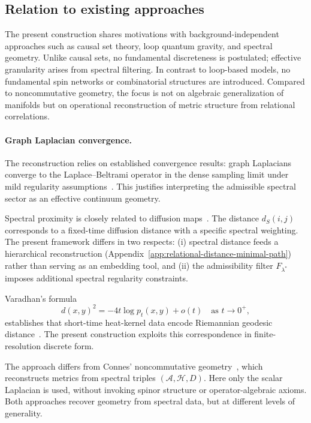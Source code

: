 \subsection{Relation to existing approaches}
  \label{subsec:relation-to-existing-approaches}

  The present construction shares motivations with
  background-independent approaches such as causal set theory,
  loop quantum gravity, and spectral geometry.
  Unlike causal sets, no fundamental discreteness is postulated;
  effective granularity arises from spectral filtering.
  In contrast to loop-based models, no fundamental spin networks
  or combinatorial structures are introduced.
  Compared to noncommutative geometry,
  the focus is not on algebraic generalization of manifolds
  but on operational reconstruction of metric structure
  from relational correlations.

  \paragraph{Graph Laplacian convergence.}

    The reconstruction relies on established convergence results:
    graph Laplacians converge to the Laplace--Beltrami operator
    in the dense sampling limit under mild regularity assumptions~\cite{Belkin2003,Hein2007}.
    This justifies interpreting the admissible spectral sector
    as an effective continuum geometry.

    Spectral proximity is closely related to diffusion maps~\cite{Coifman2006}.
    The distance $d_S(i,j)$ corresponds to a fixed-time diffusion
    distance with a specific spectral weighting.
    The present framework differs in two respects:
    (i) spectral distance feeds a hierarchical reconstruction
    (Appendix~\ref{app:relational-distance-minimal-path}) rather than serving as an embedding tool,
    and (ii) the admissibility filter $F_{\lambda^*}$
    imposes additional spectral regularity constraints.

    Varadhan’s formula
    \begin{equation}
      d(x,y)^2 = -4t \log p_t(x,y) + o(t)
      \quad \text{as } t \to 0^+,
    \end{equation}
    establishes that short-time heat-kernel data encode
    Riemannian geodesic distance~\cite{Varadhan1967}.
    The present construction exploits this correspondence
    in finite-resolution discrete form.

    The approach differs from Connes’ noncommutative geometry~\cite{Connes1994}, which reconstructs metrics from
    spectral triples $(\mathcal A,\mathcal H,D)$.
    Here only the scalar Laplacian is used,
    without invoking spinor structure or operator-algebraic axioms.
    Both approaches recover geometry from spectral data,
    but at different levels of generality.
